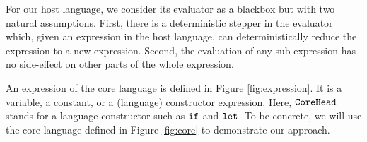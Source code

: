 For our host language, we consider its evaluator as a blackbox  but with two natural assumptions. First, there is a deterministic stepper in the evaluator which, given an expression in the host language, can deterministically reduce the expression to a new expression. Second, the evaluation of any sub-expression has no side-effect on other parts of the whole expression.

An expression of the core language is defined in Figure \ref{fig:expression}. It is a variable, a constant, or a (language) constructor expression. Here, $\mbox{\tt CoreHead}$ stands for a language constructor such as $\mbox{\tt if}$ and $\mbox{\tt let}$. To be concrete, we will use the core language defined in Figure \ref{fig:core} to demonstrate our approach.


